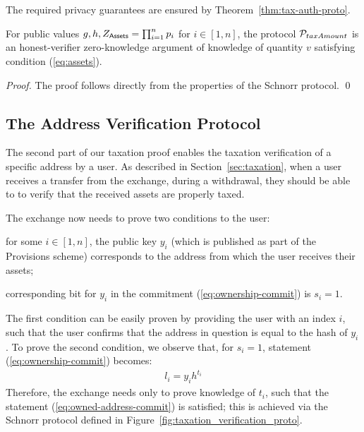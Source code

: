 The required privacy guarantees are ensured by Theorem~\ref{thm:tax-auth-proto}.

\begin{theorem}\label{thm:tax-auth-proto}
    For public values $g, h, Z_{\mathsf{Assets}} = \prod_{i = 1}^n p_i$ for $i \in [1,
    n]$, the protocol $\mathcal{P}_{taxAmount}$ is an honest-verifier zero-knowledge
    argument of knowledge of quantity $v$ satisfying condition (\ref{eq:assets}).
\end{theorem}
\begin{proof}
    The proof follows directly from the properties of the Schnorr protocol.
    \qed
\end{proof}

\subsection{The Address Verification Protocol}\label{subsec:user-verification-proto}

The second part of our taxation proof enables the taxation verification of a
specific address by a user. As described in Section~\ref{sec:taxation}, when a
user receives a transfer from the exchange, \eg during a withdrawal, they
should be able to to verify that the received assets are properly taxed.

The exchange now needs to prove two conditions to the user:
\begin{inparaenum}[i)]
    \item for some $i \in [1, n]$, the public key $y_i$ (which is published as
        part of the Provisions scheme) corresponds to the address from which
        the user receives their assets;
    \item corresponding bit for $y_i$ in the commitment
        (\ref{eq:ownership-commit}) is $s_i = 1$.
\end{inparaenum}
The first condition can be easily proven by providing the user with an index
$i$, such that the user confirms that the address in question is equal to the
hash of $y_i$. To prove the second condition, we observe that, for $s_i = 1$,
statement (\ref{eq:ownership-commit}) becomes:
\begin{align}
    l_i = y_ih^{t_i} \label{eq:owned-address-commit}
\end{align}
Therefore, the exchange needs only to prove knowledge of $t_i$, such that the
statement (\ref{eq:owned-address-commit}) is satisfied; this is achieved via
the Schnorr protocol defined in Figure~\ref{fig:taxation_verification_proto}.

